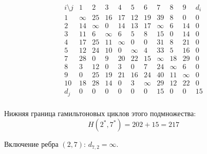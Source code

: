 \documentclass{article}
\begin{document}
\[
    \begin{array}{c|ccccccccc|c}
        i \setminus j & 1      & 2      & 3      & 4      & 5      & 6      & 7      & 8      & 9      & d_i \\
        \hline
        1             & \infty & 25     & 16     & 17     & 12     & 19     & 39     & 8      & 0      & 0   \\
        2             & 14     & \infty & 0      & 14     & 13     & 17     & \infty & 6      & 14     & 0   \\
        3             & 11     & 6      & \infty & 6      & 5      & 8      & 15     & 0      & 14     & 0   \\
        4             & 17     & 25     & 11     & \infty & 0      & 0      & 31     & 8      & 21     & 0   \\
        5             & 12     & 24     & 10     & 0      & \infty & 4      & 33     & 5      & 16     & 0   \\
        7             & 28     & 0      & 9      & 20     & 22     & 15     & \infty & 18     & 29     & 0   \\
        8             & 3      & 12     & 0      & 3      & 0      & 7      & 24     & \infty & 6      & 0   \\
        9             & 0      & 25     & 19     & 21     & 16     & 24     & 40     & 11     & \infty & 0   \\
        10            & 18     & 28     & 14     & 0      & 3      & \infty & 29     & 12     & 22     & 0   \\
        \hline
        d_j           & 0      & 0      & 0      & 0      & 0      & 0      & 15     & 0      & 0      & 15  \\
    \end{array}
\]

Нижняя граница гамильтоновых циклов этого подмножества:
\[
    H(2^*,7^*) = 202 + 15 = 217
\]

Включение ребра $(2,7)$: $d_{7,2}=\infty$.
\end{document}
